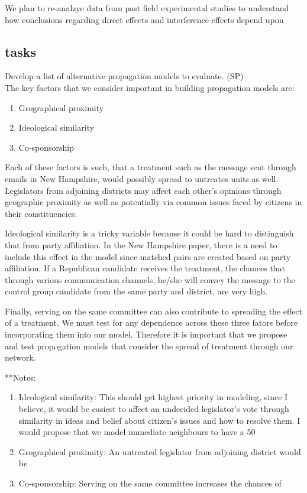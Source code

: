 \documentclass[12pt]{article}
\begin{document}
We plan to re-analzye data from past field experimental studies to understand how conclusions regarding direct effects and interference effects depend upon 

\subsection{tasks}

Develop a list of alternative propagation models to evaluate. (SP) \\

The key factors that we consider important in building propagation models are: \\

\begin{enumerate}

\item Grographical proximity
\item Ideological similarity
\item Co-sponsorship

\end{enumerate}

Each of these factors is such, that a treatment such as the message sent through emails in New Hampshire, would possibly spread to untreates units as well. Legislators from adjoining districts may affect each other's opinions through geographic proximity as well as potentially via common issues faced by citizens in their constituencies.

Ideological similarity is a tricky variable because it could be hard to distinguish that from party affiliation. In the New Hampshire paper, there is a need to include this effect in the model since matched pairs are created based on party affiliation. If a Republican candidate receives the treatment, the chances that through various communication channels, he/she will convey the message to the control group candidate from the same party and district, are very high.

Finally, serving on the same committee can also contribute to spreading the effect of a treatment. We must test for any dependence across these three fators before incorporating them into our model. Therefore it is important that we propose and test propogation models that consider the spread of treatment through our network.


**Notes:
\begin{enumerate}

\item Ideological similarity: This should get highest priority in modeling, since I believe, it would be easiest to affect an undecided legislator's vote through similarity in ideas and belief about citizen's issues and how to resolve them. I would propose that we model immediate neighbours to have a 50%
\item Grographical proximity: An untreated legislator from adjoining district would be 
\item Co-sponsorship: Serving on the same committee increases the chances of 

\end{enumerate}
\end{document}
